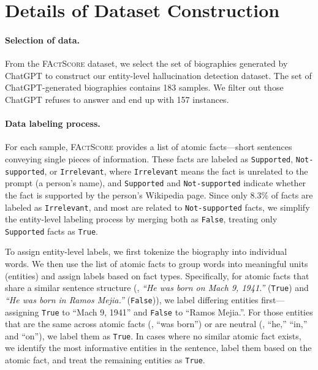 \section{Details of Dataset Construction}\label{ap:data}

\paragraph{Selection of data.}

From the \textsc{FActScore} dataset, we select the set of biographies generated by ChatGPT to construct our entity-level hallucination detection dataset. The set of ChatGPT-generated biographies contains 183 samples. We filter out those ChatGPT refuses to answer and end up with 157 instances.

\paragraph{Data labeling process.}

For each sample, \textsc{FActScore} provides a list of atomic facts—short sentences conveying single pieces of information. These facts are labeled as \texttt{Supported}, \texttt{Not-supported}, or \texttt{Irrelevant}, where \texttt{Irrelevant} means the fact is unrelated to the prompt (\ie a person's name), and \texttt{Supported} and \texttt{Not-supported} indicate whether the fact is supported by the person's Wikipedia page. Since only 8.3\% of facts are labeled as \texttt{Irrelevant}, and most are related to \texttt{Not-supported} facts, we simplify the entity-level labeling process by merging both as \texttt{False}, treating only \texttt{Supported} facts as \texttt{True}.

To assign entity-level labels, we first tokenize the biography into individual words. We then use the list of atomic facts to group words into meaningful units (entities) and assign labels based on fact types. Specifically, for atomic facts that share a similar sentence structure (\eg, \textit{``He was born on Mach 9, 1941.''} (\texttt{True}) and \textit{``He was born in Ramos Mejia.''} (\texttt{False})), we label differing entities first---assigning \texttt{True} to ``Mach 9, 1941'' and \texttt{False} to ``Ramos Mejia.''. For those entities that are the same across atomic facts (\eg, ``was born'') or are neutral (\eg, ``he,'' ``in,'' and ``on''), we label them as \texttt{True}. In cases where no similar atomic fact exists, we identify the most informative entities in the sentence, label them based on the atomic fact, and treat the remaining entities as \texttt{True}.

